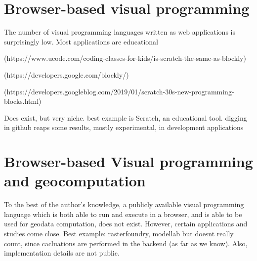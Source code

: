 \section{Browser-based visual programming}
\label{sec:related-webvpl}

The number of visual programming languages written as web applications is surprisingly low. 
Most applications are educational


(https://www.ucode.com/coding-classes-for-kids/is-scratch-the-same-as-blockly)

(https://developers.google.com/blockly/)

(https://developers.googleblog.com/2019/01/scratch-30s-new-programming-blocks.html)


Does exist, but very niche. 
best example is Scratch, an educational tool.
digging in github reaps some results, mostly experimental, in development applications

\section{Browser-based Visual programming and geocomputation} 
To the best of the author's knowledge, a publicly available visual programming language which is both able to run and execute in a browser, and is able to be used for geodata computation, does not exist. 
However, certain applications and studies come close. 
Best example: rasterfoundry, modellab but doesnt really count, since cacluations are performed in the backend (as far as we know). 
Also, implementation details are not public. 


